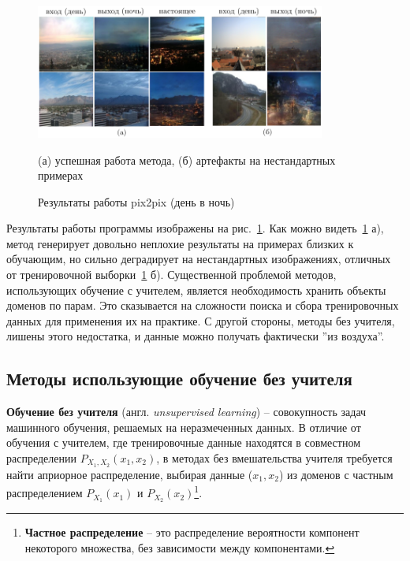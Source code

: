 \documentclass[11pt,a4paper]{extarticle}
\begin{document}
			\begin{figure}[ht]
				\centering
				\includegraphics[width=0.85\textwidth]{img/pix2pix_res}
				\caption{Результаты работы pix2pix (день в ночь)}{
					\small{
					(а) успешная работа метода,
					(б) артефакты на нестандартных примерах
				}}
				\label{pic:pix2pix_results}
			\end{figure}
			\noindent
			Результаты работы программы изображены на рис.~\ref{pic:pix2pix_results}.
			Как можно видеть~\ref{pic:pix2pix_results} а), метод генерирует довольно неплохие результаты на примерах близких к обучающим,
			но сильно деградирует на нестандартных изображениях, отличных от тренировочной выборки~\ref{pic:pix2pix_results} б). 
			\newline\newline
			Существенной проблемой методов, использующих обучение с учителем, является необходимость хранить объекты доменов по парам.
			Это сказывается на сложности поиска и сбора тренировочных данных для применения их на практике.
			С другой стороны, методы без учителя, лишены этого недостатка, и данные можно получать фактически ''из воздуха''.
			
			
	\subsection{Методы использующие обучение без учителя}

		\textbf{Обучение без учителя} (англ. \textit{unsupervised learning}) -- совокупность задач машинного обучения, решаемых на неразмеченных данных.
		В отличие от обучения с учителем, где тренировочные данные находятся в совместном распределении \(P_{X_{1},X_{2}}(x_{1},x_{2})\), в методах без вмешательства учителя требуется
		найти априорное распределение, выбирая данные (\(x_{1},x_{2}\)) из доменов с частным распределением \(P_{X_{1}}(x_{1})\) и  \(P_{X_{2}}(x_{2})\)\footnote{
			\textbf{Частное распределение} -- это распределение вероятности компонент некоторого множества, без зависимости между компонентами.
		}.
\end{document}
